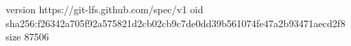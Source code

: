 version https://git-lfs.github.com/spec/v1
oid sha256:f26342a705f92a575821d2cb02cb9c7de0dd39b561074fe47a2b93471aecd2f8
size 87506
